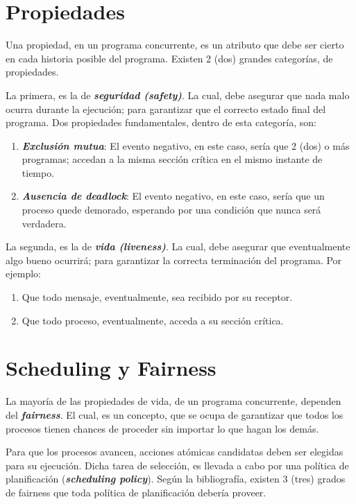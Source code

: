 \documentclass[a4paper, 10pt]{report}
\begin{document}
\section{Propiedades}

Una propiedad, en un programa concurrente, es un atributo que debe ser cierto en cada historia posible del programa. Existen 2 (dos) grandes categorías, de propiedades.

La primera, es la de \textbf{\emph{seguridad (safety)}}. La cual, debe asegurar que nada malo ocurra durante la ejecución; para garantizar que el correcto estado final del programa. Dos propiedades fundamentales, dentro de esta categoría, son:

\begin{enumerate}
    \item \textbf{\emph{Exclusión mutua}}: El evento negativo, en este caso, sería que 2 (dos) o más programas; accedan a la misma sección crítica en el mismo instante de tiempo.
    \item \textbf{\emph{Ausencia de deadlock}}: El evento negativo, en este caso, sería que un proceso quede demorado, esperando por una condición que nunca será verdadera. 
\end{enumerate}

La segunda, es la de \textbf{\emph{vida (liveness)}}. La cual, debe asegurar que eventualmente algo bueno ocurrirá; para garantizar la correcta terminación del programa. Por ejemplo:

\begin{enumerate}
    \item Que todo mensaje, eventualmente, sea recibido por su receptor.
    \item Que todo proceso, eventualmente, acceda a su sección crítica.
\end{enumerate}

\section{Scheduling y Fairness}

La mayoría de las propiedades de vida, de un programa concurrente, dependen del \textbf{\emph{fairness}}. El cual, es un concepto, que se ocupa de garantizar que todos los procesos tienen chances de proceder sin importar lo que hagan los demás.

Para que los procesos avancen, acciones atómicas candidatas deben ser elegidas para su ejecución. Dicha tarea de selección, es llevada a cabo por una política de planificación (\textbf{\emph{scheduling policy}}). Según la bibliografía, existen 3 (tres) grados de fairness que toda política de planificación debería proveer.
\end{document}
